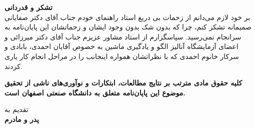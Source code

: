 \thispagestyle{empty}
\vspace*{3cm}

{\large
	\textbf{تشکر و قدردانی}\\

	
بر خود لازم می‌‌دانم از زحمات بی‌ دریغ استاد راهنمای خودم جناب آقای دکتر صفایانی صمیمانه تشکر کنم، چرا که بدون شک بدون وجود ایشان و زحماتشان این پایان‌نامه به سرانجام نمی‌‌رسید. سپاسگزارم از استاد مشاور عزیزم جناب آقای دکتر میرزائی و اعضای آزمایشگاه آنالیز الگو و یادگیری ماشین به خصوص آقایان احمدی‌، بابادی و سرکار خانوم احمدی‌ که با نظراتشان همواره اینجانب را در مراحل انجام کار یاری کردند.

}
\restoregeometry
\pagebreak
{}
\thispagestyle{empty}

\begin{spacing}{3}
	\leavevmode
	\vfill
	\parbox{8 cm}{
		
		\textbf{\Large کلیه حقوق مادی مترتب بر نتایج مطالعات، ابتکارات و نوآوری‌های ناشی از تحقیق موضوع این پایان‌نامه متعلق به دانشگاه صنعتی اصفهان است.}
		
	}
	\vfill
\end{spacing}
\restoregeometry
\pagebreak

\thispagestyle{empty}


\vspace*{\fill}
\begin{center}
{\LARGE تقدیم به}\\
\vspace{1cm}
\textbf{{\Huge پدر و مادرم}}
\end{center}
\vspace*{\fill}

\bgroup\vspace*{\fill}
\renewcommand{\\}{\vspace{-.5em}\newline\relax}
\newcommand{\تب}[1][.5]{\hspace*{#1cm}}
\noindent
\vspace*{\fill}\egroup
\pagebreak


